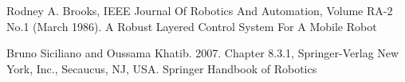 \documentclass[
	twoside,
	fontsize=12pt,
	headsepline,
	cleardoublepage=empty,
	numbers=noenddot,
]{scrbook}
\renewcommand{\thesisAuthor}{Julian Daberkow\\Julian Exner\\Andreas Gatting\\Timo Michalski\\Hendrik Oestreich}
\renewcommand{\thesisDate}{Bielefeld, März 2016}
\begin{document}


\cleardoublepage


\tableofcontents

\cleardoublepage
{}






\appendix
\listoffigures
%
%



%
%
%
%

\begin{thebibliography}{9}
	Rodney A. Brooks, IEEE Journal Of Robotics And Automation, Volume RA-2 No.1 (March 1986).
	\newblock A Robust Layered Control System For A Mobile Robot
	
	Bruno Siciliano and Oussama Khatib. 2007. Chapter 8.3.1, Springer-Verlag New York, Inc., Secaucus, NJ, USA.
	\newblock Springer Handbook of Robotics
	
	
\end{thebibliography}
\end{document}
